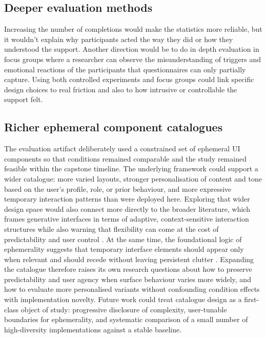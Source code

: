 \subsection{Deeper evaluation methods}


Increasing the number of completions would make the statistics more reliable, but it wouldn't explain why participants acted the way they did or how they understood the support. Another direction would be to do in depth evaluation in focus groups where a researcher can observe the misunderstanding of triggers and emotional reactions of the participants that questionnaires can only partially capture. Using both controlled experiments and focus groups could link specific design choices to real friction and also to how intrusive or controllable the support felt.

\subsection{Richer ephemeral component catalogues}

The evaluation artifact deliberately used a constrained set of ephemeral UI components so that conditions remained comparable and the study remained feasible within the capstone timeline. The underlying framework could support a wider catalogue: more varied layouts, stronger personalisation of content and tone based on the user's profile, role, or prior behaviour, and more expressive temporary interaction patterns than were deployed here. Exploring that wider design space would also connect more directly to the broader literature, which frames generative interfaces in terms of adaptive, context-sensitive interaction structures while also warning that flexibility can come at the cost of predictability and user control \parencite{Bieniek2024GenerativeAI}. At the same time, the foundational logic of ephemerality suggests that temporary interface elements should appear only when relevant and should recede without leaving persistent clutter \parencite{Doring2013EphemeralUI}. Expanding the catalogue therefore raises its own research questions about how to preserve predictability and user agency when surface behaviour varies more widely, and how to evaluate more personalised variants without confounding condition effects with implementation novelty. Future work could treat catalogue design as a first-class object of study: progressive disclosure of complexity, user-tunable boundaries for ephemerality, and systematic comparison of a small number of high-diversity implementations against a stable baseline.

